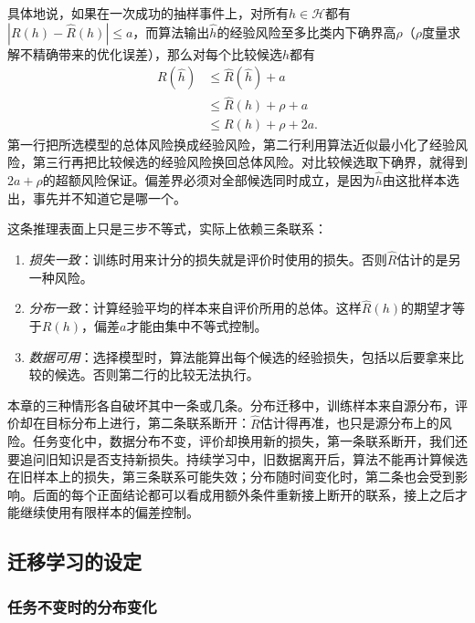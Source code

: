 具体地说，如果在一次成功的抽样事件上，对所有$h\in\mathcal H$都有$|R(h)-\widehat R(h)|\leq a$，而算法输出$\widehat h$的经验风险至多比类内下确界高$\rho$（$\rho$度量求解不精确带来的优化误差），那么对每个比较候选$h$都有
\begin{equation}
 \begin{aligned}
 R(\widehat h)&\leq\widehat R(\widehat h)+a\\
 &\leq\widehat R(h)+\rho+a\\
 &\leq R(h)+\rho+2a.
 \end{aligned}
 \label{eq:transfer-iid-comparison}
\end{equation}
第一行把所选模型的总体风险换成经验风险，第二行利用算法近似最小化了经验风险，第三行再把比较候选的经验风险换回总体风险。对比较候选取下确界，就得到$2a+\rho$的超额风险保证。偏差界必须对全部候选同时成立，是因为$\widehat h$由这批样本选出，事先并不知道它是哪一个。

这条推理表面上只是三步不等式，实际上依赖三条联系：
\begin{enumerate}
 \item \emph{损失一致}：训练时用来计分的损失就是评价时使用的损失。否则$\widehat R$估计的是另一种风险。
 \item \emph{分布一致}：计算经验平均的样本来自评价所用的总体。这样$\widehat R(h)$的期望才等于$R(h)$，偏差$a$才能由集中不等式控制。
 \item \emph{数据可用}：选择模型时，算法能算出每个候选的经验损失，包括以后要拿来比较的候选。否则第二行的比较无法执行。
\end{enumerate}
本章的三种情形各自破坏其中一条或几条。分布迁移中，训练样本来自源分布，评价却在目标分布上进行，第二条联系断开：$\widehat R$估计得再准，也只是源分布上的风险。任务变化中，数据分布不变，评价却换用新的损失，第一条联系断开，我们还要追问旧知识是否支持新损失。持续学习中，旧数据离开后，算法不能再计算候选在旧样本上的损失，第三条联系可能失效；分布随时间变化时，第二条也会受到影响。后面的每个正面结论都可以看成用额外条件重新接上断开的联系，接上之后才能继续使用有限样本的偏差控制。

\subsection{迁移学习的设定}
\label{sec:transfer-settings-overview}

\subsubsection{任务不变时的分布变化}

